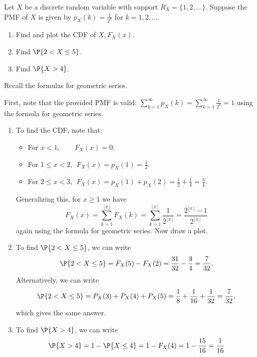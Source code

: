 \begin{exercise}\label{ex32111}
	Let $X$ be a discrete random variable with support $R_X=\{1, 2, \ldots\}$. Suppose the PMF of $X$ is given by $p_X(k) = \frac{1}{2^{k}}$ for $k = 1, 2 , \ldots$.
	\begin{enumerate}
		\item Find and plot the CDF of $X, F_X(x)$.
		\item Find $\P{2<X \leq 5}$.
		\item Find $\P{X>4}$.
	\end{enumerate}
	\begin{hint}
		Recall the formulas for geometric series.
	\end{hint}
	\begin{solution}
		First, note that the provided PMF is valid: $\sum_{k = 1}^{\infty} p_X(k)=\sum_{k=1}^{\infty} \frac{1}{2^{k}} = 1$ using the formula for geometric series.
		\begin{enumerate}
			\item  To find the CDF, note that:
			\begin{itemize}
				\item For $x<1, \quad \quad F_X(x)=0$.
				\item For $1 \leq x<2, \: \: F_X(x)=p_X(1)=\frac{1}{2}$.
				\item For $2 \leq x<3, \: \: F_X(x)=p_X(1)+p_X(2)=\frac{1}{2}+\frac{1}{4}=\frac{3}{4}$.
			\end{itemize}
			Generalizing this, for $x \geq 1$ we have
			\begin{equation*}
				F_{X}(x) = \sum_{k = 1}^{\lfloor x \rfloor} F_X(k) = \sum_{k = 1}^{\lfloor x \rfloor} \frac{1}{2^{\lfloor x \rfloor}} = \frac{2^{\lfloor x \rfloor}-1}{2^{\lfloor x \rfloor}}
			\end{equation*}
			again using the formula for geometric series. Now draw a plot.
			\item To find $\P{2<X \leq 5}$, we can write
			\begin{equation*}
				\P{2<X \leq 5} = F_{X}(5) - F_{X}(2) = \frac{31}{32}-\frac{3}{4}=\frac{7}{32}.
			\end{equation*}
			Alternatively, we can write
			\begin{equation*}
				\P{2<X \leq 5} = P_{X}(3)+P_{X}(4)+P_{X}(5)=\frac{1}{8}+\frac{1}{16}+\frac{1}{32}=\frac{7}{32},
			\end{equation*}
			which gives the same answer.
			\item To find $\P{X>4}$, we can write
			\begin{equation*}
				\P{X>4} = 1 - \P{X \leq 4} = 1-F_{X}(4)=1-\frac{15}{16}=\frac{1}{16}
			\end{equation*}
		\end{enumerate}
	\end{solution}
\end{exercise}

